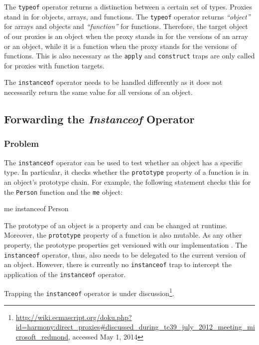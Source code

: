 The \lstinline{typeof} operator returns a distinction between a certain set of types.
Proxies stand in for objects, arrays, and functions.
The \lstinline{typeof} operator returns \emph{``object''} for arrays and objects and \emph{``function''} for functions.
Therefore, the target object of our proxies is an object when the proxy stands in for the versions of an array or an object, while it is a function when the proxy stands for the versions of functions.
This is also necessary as the \lstinline{apply} and \lstinline{construct} traps are only called for proxies with function targets.

The \lstinline{instanceof} operator needs to be handled differently as it does not necessarily return the same value for all versions of an object.


\subsection{Forwarding the \emph{Instanceof} Operator}

\subsubsection{Problem}

The \lstinline{instanceof} operator can be used to test whether an object has a specific type.
In particular, it checks whether the \lstinline{prototype} property of a function is in an object's prototype chain.
For example, the following statement checks this for the \lstinline{Person} function and the \lstinline{me} object:

\begin{code}{}{}
me instanceof Person
\end{code}
\iffalse
\end{verbatim}\fi

The prototype of an object is a property and can be changed at runtime.
Moreover, the \lstinline{prototype} property of a function is also mutable.
As any other property, the prototype properties get versioned with our implementation .
The \lstinline{instanceof} operator, thus, also needs to be delegated to the current version of an object.
However, there is currently no \lstinline{instanceof} trap to intercept the application of the \lstinline{instanceof} operator.

Trapping the \lstinline{instanceof} operator is under discussion\footnote{\url{http://wiki.ecmascript.org/doku.php?id=harmony:direct_proxies\#discussed_during_tc39_july_2012_meeting_microsoft_redmond}, accessed May 1, 2014}.


